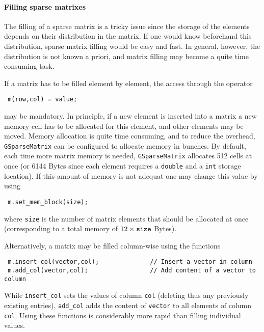 \documentclass{article}[12pt,a4]
\begin{document}
\paragraph{Filling sparse matrixes}
\label{sec:matrix:filling}

The filling of a sparse matrix is a tricky issue since the storage
of the elements depends on their distribution in the matrix.
If one would know beforehand this distribution, sparse matrix filling
would be easy and fast.
In general, however, the distribution is not known a priori, and
matrix filling may become a quite time consuming task.

If a matrix has to be filled element by element, the access through
the operator
\begin{verbatim}
 m(row,col) = value;
\end{verbatim}
may be mandatory.
In principle, if a new element is inserted into a matrix a new memory
cell has to be allocated for this element, and other elements may be 
moved.
Memory allocation is quite time consuming, and to reduce the overhead,
{\tt GSparseMatrix} can be configured to allocate memory in bunches.
By default, each time more matrix memory is needed, {\tt GSparseMatrix}
allocates 512 cells at once (or 6144 Bytes since each element requires 
a {\tt double} and a {\tt int} storage location).
If this amount of memory is not adequat one may change this value by
using
\begin{verbatim}
 m.set_mem_block(size);
\end{verbatim}
where {\tt size} is the number of matrix elements that should be
allocated at once (corresponding to a total memory of 
$12 \times {\tt size}$ Bytes).

Alternatively, a matrix may be filled column-wise using the functions
\begin{verbatim}
 m.insert_col(vector,col);              // Insert a vector in column
 m.add_col(vector,col);                 // Add content of a vector to column
\end{verbatim}
While {\tt insert\_col} sets the values of column {\tt col} (deleting 
thus any previously existing entries), {\tt add\_col} adds the content 
of {\tt vector} to all elements of column {\tt col}.
Using these functions is considerably more rapid than filling individual 
values.
\end{document}
